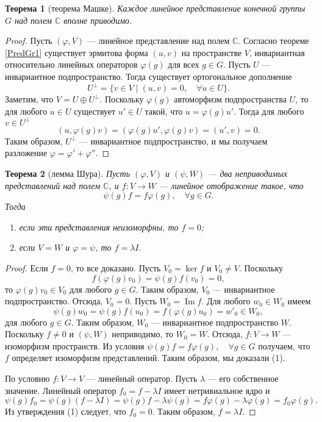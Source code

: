 \documentclass[12pt, titlepage, oneside]{amsbook}
\newcommand{\Ime}{\operatorname{Im}}
\newcommand{\CC}{\mathbb{C}}
\newtheorem{theorem}{Теорема}[chapter]
\theoremstyle{definition}
\theoremstyle{remark}
\begin{document}
\begin{theorem}[теорема Машке]
	\label{PredGr2}
	Каждое линейное представление конечной группы $G$ над полем $\CC$ вполне приводимо.
\end{theorem}

\begin{proof}
	Пусть $(\varphi,V)$ --- линейное представление над полем $\CC$. Согласно теореме \ref{PredGr1} существует эрмитова форма $(u,v)$ на пространстве $V$, инвариантная относительно линейных операторов $\varphi(g)$ для всех $g\in G$. Пусть $U$ --- инвариантное подпространство. Тогда существует ортогональное дополнение $$U^{\bot}=\{v\in V\mid (u,v)=0,\quad \forall u\in U\}.$$ Заметим, что $V=U\oplus U^{\bot}$. Поскольку $\varphi(g)$ автоморфизм подпространства $U$, то для любого $u\in U$ существует $u'\in U$ такой, что $u=\varphi(g)u'$. Тогда для любого $v\in U^{\bot}$ $$(u,\varphi(g)v)=(\varphi(g)u',\varphi(g)v)=(u',v)=0.$$ Таким образом, $U^{\bot}$ --- инвариантное подпространство, и мы получаем разложение $\varphi=\varphi'+\varphi''$.
\end{proof}

\begin{theorem}[лемма Шура]
	\label{PredGr3}
	Пусть $(\varphi,V)$ и $(\psi,W)$ --- два неприводимых представлений над полем $\CC$, и $f\colon V\rightarrow W$ --- линейное отображение такое, что $$\psi(g)f=f\varphi(g),\quad \forall g\in G.$$ Тогда \begin{enumerate}
		\item если эти представления неизоморфны, то $f=0$;
		\item если $V=W$ и $\varphi=\psi$, то $f=\lambda I$.
	\end{enumerate}
\end{theorem}

\begin{proof}
	Если $f=0$, то все доказано. Пусть $V_0=\ker f$ и $V_0\neq V$. Поскольку $$f(\varphi(g)v_0)=\psi(g)f(v_0)=0,$$ то $\varphi(g)v_0\in V_0$ для любого $g\in G$. Таким образом, $V_0$ --- инвариантное подпространство. Отсюда, $V_0=0$. Пусть $W_0=\Ime f$. Для любого $w_0\in W_0$ имеем $$\psi(g)w_0=\psi(g)f(u_0)=f(\varphi(g)u_0)=w'_0\in W_0,$$ для любого $g\in G$. Таким образом, $W_0$ --- инвариантное подпространство $W$. Поскольку $f\neq 0$ и $(\psi,W)$ неприводимо, то $W_0=W$. Отсюда, $f\colon V\rightarrow W$ --- изоморфизм пространств. Из условия $\psi(g)f=f\varphi(g),\quad \forall g\in G$ получаем, что $f$ определяет изоморфизм представлений. Таким образом, мы доказали (1).
	
	По условию $f\colon V\rightarrow V$ --- линейный оператор. Пусть $\lambda$ --- его собственное значение. Линейный оператор $f_0=f-\lambda I$ имеет нетривиальное ядро и $$\psi(g)f_0=\psi(g)(f-\lambda I)=\psi(g)f-\lambda\psi(g)=f\varphi(g)-\lambda\varphi(g)=f_0\varphi(g).$$ Из утверждения (1) следует, что $f_0=0$. Таким образом, $f=\lambda I$.
\end{proof}
\end{document}
